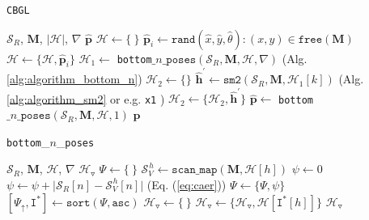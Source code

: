 \begin{algorithm}
  \caption{\texttt{CBGL}}
  \begin{spacing}{1.2}
  \begin{algorithmic}[1]
    \REQUIRE $\mathcal{S}_R$, $\bm{M}$, $|\mathcal{H}|$, $\nabla$
    \ENSURE $\hat{\bm{p}}$
    \STATE $\mathcal{H} \leftarrow \{\ \}$
      \STATE $\hat{\bm{p}}_i \leftarrow \texttt{rand}(\hat{x},\hat{y},\hat{\theta}): (x,y) \in \texttt{free}(\bm{M})$
      \STATE $\mathcal{H} \leftarrow \{\mathcal{H}, \hat{\bm{p}}_i\}$
    \ENDFOR
    \STATE $\mathcal{H}_1 \leftarrow$ \texttt{bottom}$\_n\_\texttt{poses}(\mathcal{S}_R, \bm{M}, \mathcal{H}, \nabla)$ \hfill (Alg. \ref{alg:algorithm_bottom_n})
    \STATE $\mathcal{H}_2 \leftarrow \{ \}$
      \STATE $\hat{\bm{h}}^\prime \leftarrow \texttt{sm2}(\mathcal{S}_R, \bm{M}, \mathcal{H}_1[k])$ \hfill \small (Alg. \ref{alg:algorithm_sm2} or e.g. \texttt{x1} \cite{FILOTHEOU2023100288})
      \STATE $\mathcal{H}_2 \leftarrow \{\mathcal{H}_2, \hat{\bm{h}}^\prime\}$
    \ENDFOR
    \STATE $\hat{\bm{p}} \leftarrow$ \texttt{bottom}$\_n\_\texttt{poses}(\mathcal{S}_R, \bm{M}, \mathcal{H}, 1)$
    \RETURN $\hat{\bm{p}}$
  \end{algorithmic}
  \end{spacing}
  \label{alg:algorithm_cbgl}
\end{algorithm}

\begin{algorithm}
  \caption{\texttt{bottom}\_$n$\_\texttt{poses}}
  \begin{spacing}{1.2}
  \begin{algorithmic}[1]
    \REQUIRE $\mathcal{S}_R$, $\bm{M}$, $\mathcal{H}$, $\nabla$
    \ENSURE $\mathcal{H}_{\triangledown}$
    \STATE $\Psi \leftarrow \{\ \}$
      \STATE $\mathcal{S}_V^{\hspace{1pt} h} \leftarrow \texttt{scan\_map}(\bm{M}, \mathcal{H}[h])$
      \STATE $\psi \leftarrow 0$
        \STATE $\psi \leftarrow \psi + \big|\mathcal{S}_R[n]-\mathcal{S}_V^{\hspace{1pt} h}[n]\big|$ \hfill \small (Eq. (\ref{eq:caer}))
      \ENDFOR
      \STATE $\Psi \leftarrow \{\Psi, \psi\}$
    \ENDFOR
    \STATE $[\Psi_{\uparrow}, \texttt{I}^{\ast}] \leftarrow \texttt{sort}(\Psi, \texttt{asc})$
    \STATE $\mathcal{H}_{\triangledown} \leftarrow \{\ \}$
      \STATE $\mathcal{H}_{\triangledown} \leftarrow \{\mathcal{H}_{\triangledown}, \mathcal{H}[\texttt{I}^{\ast}[h]]\}$
    \ENDFOR
    \RETURN $\mathcal{H}_{\triangledown}$
  \end{algorithmic}
  \end{spacing}
  \label{alg:algorithm_bottom_n}
\end{algorithm}


